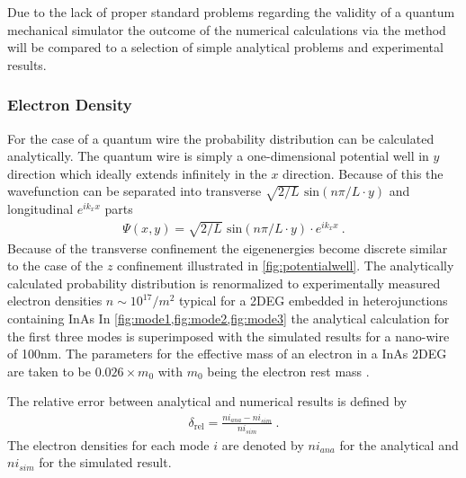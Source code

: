 Due to the lack of proper standard problems regarding the validity of a quantum mechanical simulator the outcome of the numerical calculations via the \gfnc{} method will be compared to a selection of simple analytical problems and experimental results.\par
\subsubsection{Electron Density}
For the case of a quantum wire the probability distribution can be calculated analytically. The quantum wire is simply a one-dimensional potential well in $y$ direction which ideally extends infinitely in the $x$ direction.
Because of this the wavefunction can be separated into transverse $\sqrt{2/L}\text{ sin}(n\pi/L \cdot y)$ and longitudinal $e^{ik_xx}$ parts
\begin{align}
\Psi(x,y) = \sqrt{2/L}\text{ sin}(n\pi/L \cdot y) \cdot e^{ik_xx}\ .
\end{align}
Because of the transverse confinement the eigenenergies become discrete similar to the case of the $z$ confinement illustrated in \cref{fig:potentialwell}.
The analytically calculated probability distribution is renormalized to experimentally measured electron densities $n \sim 10^{17}/m^2$ typical for a 2DEG embedded in heterojunctions containing InAs \cite{gelfand2006} \cite{JJAP.26.L59}
In \cref{fig:mode1,fig:mode2,fig:mode3} the analytical calculation for the first three modes is superimposed with the simulated results for a nano-wire of 100nm. 
The parameters for the effective mass of an electron in a InAs 2DEG are taken to be $0.026\times m_0$ with $m_0$ being the electron rest mass \cite{PhysRev.105.460}.\par
The relative error between analytical and numerical results is defined by
\begin{align}
\delta_{\text{rel}} = \frac{ni_{ana}-ni_{sim}}{ni_{sim}}\ .
\end{align}
The electron densities for each mode $i$ are denoted by $ni_{ana}$ for the analytical and $ni_{sim}$ for the simulated result.
